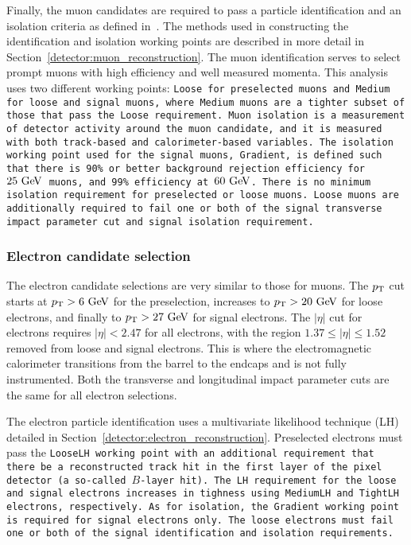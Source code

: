 Finally, the muon candidates are required to pass a particle identification and an isolation criteria as defined in~\cite{2016.muon-reconstruction-13tev}.
The methods used in constructing the identification and isolation working points are described in more detail in Section~\ref{detector:muon_reconstruction}.
The muon identification serves to select prompt muons with high efficiency and well measured momenta. %
This analysis uses two different working points: \tt{Loose} for preselected muons and \tt{Medium} for loose and signal muons, where \tt{Medium} muons are a tighter subset of those that pass the \tt{Loose} requirement.
Muon isolation is a measurement of detector activity around the muon candidate, and it is measured with both track-based and calorimeter-based variables.
The isolation working point used for the signal muons, \tt{Gradient}, is defined such that there is 90\% or better background rejection efficiency for $25\gev$ muons, and 99\% efficiency at $60\gev$.
There is no minimum isolation requirement for preselected or loose muons.
Loose muons are additionally required to fail one or both of the signal transverse impact parameter cut and signal isolation requirement.



\subsubsection{Electron candidate selection}
The electron candidate selections are very similar to those for muons.
The $p_{\mathrm{T}}$ cut starts at $\pt > 6\gev$ for the preselection, increases to $\pt > 20\gev$ for loose electrons, and finally to $\pt > 27\gev$ for signal electrons.
The $|\eta|$ cut for electrons requires $|\eta| < 2.47$ for all electrons, with the region $1.37 \le |\eta| \le 1.52$ removed from loose and signal electrons.
This is where the electromagnetic calorimeter transitions from the barrel to the endcaps and is not fully instrumented.
Both the transverse and longitudinal impact parameter cuts are the same for all electron selections.

The electron particle identification uses a multivariate likelihood technique (LH) detailed in Section~\ref{detector:electron_reconstruction}.
Preselected electrons must pass the \tt{LooseLH} working point with an additional requirement that there be a reconstructed track hit in the first layer of the pixel detector (a so-called $B$-layer hit).
The LH requirement for the loose and signal electrons increases in tighness using \tt{MediumLH} and \tt{TightLH} electrons, respectively.
As for isolation, the \tt{Gradient} working point is required for signal electrons only.
The loose electrons must fail one or both of the signal identification and isolation requirements.

